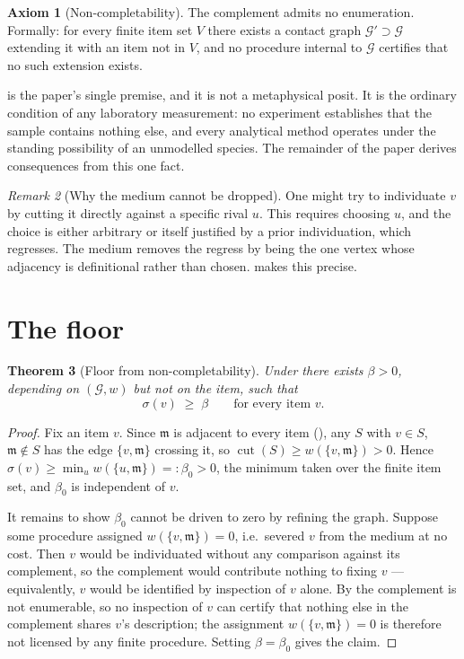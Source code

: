 \documentclass[11pt,a4paper]{article}
\newtheorem{theorem}{Theorem}[section]
\theoremstyle{definition}
\newtheorem{axiom}[theorem]{Axiom}
\theoremstyle{remark}
\newtheorem{remark}[theorem]{Remark}
\newcommand{\Gph}{\mathcal{G}}              %
\newcommand{\wt}{w}                          %
\newcommand{\med}{\mathfrak{m}}              %
\newcommand{\flo}{\beta}                     %
\newcommand{\cut}{\operatorname{cut}}
\newcommand{\sep}{\sigma}                    %
\begin{document}
\begin{axiom}[Non-completability]
\label{ax:noncomplete}
The complement admits no enumeration. Formally: for every finite item set
$V$ there exists a contact graph $\Gph'\supset\Gph$ extending it with an
item not in $V$, and no procedure internal to $\Gph$ certifies that no
such extension exists.
\end{axiom}

 is the paper's single premise, and it is not a
metaphysical posit. It is the ordinary condition of any laboratory
measurement: no experiment establishes that the sample contains nothing
else, and every analytical method operates under the standing possibility
of an unmodelled species. The remainder of the paper derives
consequences from this one fact.

\begin{remark}[Why the medium cannot be dropped]
\label{rem:medium-why}
One might try to individuate $v$ by cutting it directly against a
specific rival $u$. This requires choosing $u$, and the choice is
either arbitrary or itself justified by a prior individuation, which
regresses. The medium removes the regress by being the one vertex whose
adjacency is definitional rather than chosen. 
makes this precise.
\end{remark}

\section{The floor}
\label{sec:floor}

\begin{theorem}[Floor from non-completability]
\label{thm:floor}
Under  there exists $\flo>0$, depending on
$(\Gph,\wt)$ but not on the item, such that
\[
  \sep(v)\;\ge\;\flo
  \qquad\text{for every item } v.
\]
\end{theorem}

\begin{proof}
Fix an item $v$. Since $\med$ is adjacent to every item
(), any $S$ with $v\in S$, $\med\notin S$ has the edge
$\{v,\med\}$ crossing it, so
$\cut(S)\ge \wt(\{v,\med\})>0$. Hence
$\sep(v)\ge\min_{u}\wt(\{u,\med\})=:\flo_0>0$, the minimum taken over the
finite item set, and $\flo_0$ is independent of $v$.

It remains to show $\flo_0$ cannot be driven to zero by refining the
graph. Suppose some procedure assigned $\wt(\{v,\med\})=0$, i.e.\
severed $v$ from the medium at no cost. Then $v$ would be individuated
without any comparison against its complement, so the complement would
contribute nothing to fixing $v$ --- equivalently, $v$ would be
identified by inspection of $v$ alone. By  the
complement is not enumerable, so no inspection of $v$ can certify that
nothing else in the complement shares $v$'s description; the assignment
$\wt(\{v,\med\})=0$ is therefore not licensed by any finite procedure.
Setting $\flo=\flo_0$ gives the claim.
\end{proof}
\end{document}
